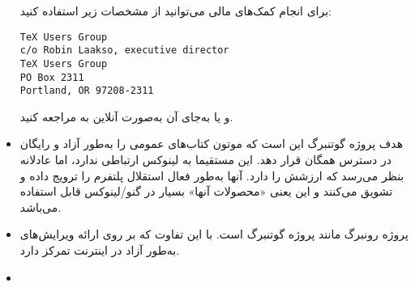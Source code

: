 \begin{itemize}
برای انجام کمک‌های مالی می‌توانید از مشخصات زیر استفاده کنید:
\begin{latin}
\begin{tscreen}
\begin{verbatim}
TeX Users Group
c/o Robin Laakso, executive director
TeX Users Group
PO Box 2311
Portland, OR 97208-2311
\end{verbatim}
\end{tscreen}
\end{latin}

و یا به‌جای آن به‌صورت آنلاین به
مراجعه کنید.

\item
{}

هدف پروژه گوتنبرگ این است که موتون کتاب‌های عمومی را به‌طور آزاد و رایگان
در دسترس همگان قرار دهد. این مستقیما به لینوکس ارتباطی ندارد، اما عادلانه
بنظر می‌رسد که ارزشش را دارد. آنها به‌طور فعال استقلال پلتفرم را ترویج داده
و تشویق می‌کنند و این یعنی «محصولات آنها» بسیار در گنو/لینوکس قابل استفاده می‌باشد.



\item
{}

پروژه رونبرگ مانند پروژه گوتنبرگ است. با این تفاوت که بر روی
ارائه ویرایش‌های
به‌طور آزاد در اینترنت تمرکز دارد.

% 

\item
{}





\end{itemize}
